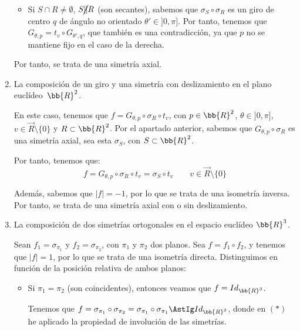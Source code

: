 \begin{ejercicio}
\begin{enumerate}
\begin{itemize}
            \item Si $S\cap R \neq \emptyset$, $S \cancel{\|} R$ (son secantes),
            sabemos que $\sigma_{S} \circ \sigma_{R}$ es un giro de centro $q$ de ángulo no orientado $\theta' \in ]0, \pi]$.
            Por tanto, tenemos que $G_{\theta, p} = t_v\circ G_{\theta', q}$,
            que también es una contradicción, ya que $p$ no se mantiene fijo en el caso de la derecha.
        \end{itemize}
        
        Por tanto, se trata de una simetría axial.


        \item La composición de un giro y una simetría con deslizamiento en el plano euclídeo~$\bb{R}^2$.
        
        En este caso, tenemos que $f = G_{\theta, p} \circ \sigma_{R} \circ t_v$, con $p\in \bb{R}^2$, $\theta \in ]0, \pi]$, $v\in \vec{R}\setminus \{0\}$ y
        $R\subset \bb{R}^2$. Por el apartado anterior, sabemos que $G_{\theta, p} \circ \sigma_{R}$ es una simetría axial, sea esta $\sigma_{S}$, con $S\subset \bb{R}^2$.

        Por tanto, tenemos que:
        \begin{equation*}
            f=G_{\theta, p} \circ \sigma_{R} \circ t_v = \sigma_{S} \circ t_v \qquad v\in \vec{R}\setminus \{0\}
        \end{equation*}

        Además, sabemos que $|f| = -1$, por lo que se trata de una isometría inversa. Por tanto, se trata de una simetría axial con o sin deslizamiento.


        \item La composición de dos simetrías ortogonales en el espacio euclídeo $\bb{R}^3$.
        
        Sean $f_1 = \sigma_{\pi_1}$ y $f_2 = \sigma_{\pi_2}$, con $\pi_1$ y $\pi_2$ dos planos.
        Sea $f = f_1 \circ f_2$, y tenemos que $|f| = 1$, por lo que se trata de una isometría directa.
        Distinguimos en función de la posición relativa de ambos planos:
        \begin{itemize}
            \item Si $\pi_1=\pi_2$ (son coincidentes), entonces veamos que $f=Id_{\bb{R}^3}$.
            
            Tenemos que $f=\sigma_{\pi_1} \circ \sigma_{\pi_2}=\sigma_{\pi_1} \circ \sigma_{\pi_1} \AstIg Id_{\bb{R}^3}$,
            donde en $(\ast)$ he aplicado la propiedad de involución de las simetrías.


\end{itemize}
\end{enumerate}
\end{ejercicio}
